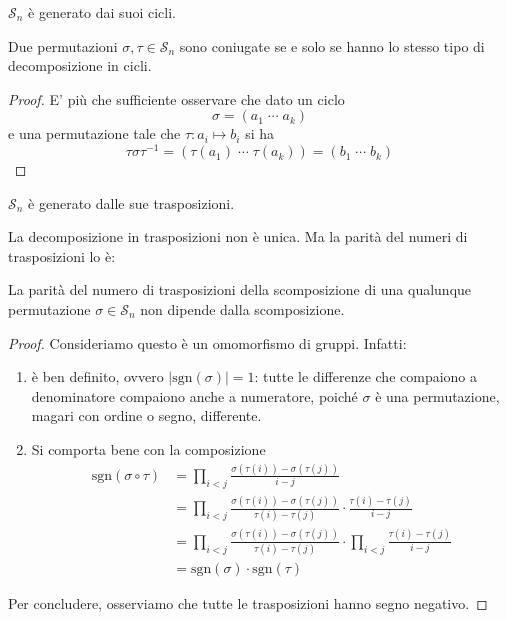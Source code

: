 \begin{multicols}{2}
\begin{remark}
	$ \mathcal{S}_n $ è generato dai suoi cicli.
\end{remark}
\begin{prop}
	Due permutazioni $ \sigma, \tau \in \mathcal{S}_n $ sono coniugate se e solo se hanno lo stesso tipo di decomposizione in cicli.
\end{prop}
\begin{proof}
	E' più che sufficiente osservare che dato un ciclo $$  \sigma = (a_1 \; \cdots \; a_k)  $$ e una permutazione tale che $ \tau : a_i \mapsto b_i $ si ha
	\[\tau\sigma\tau^{-1} = (\tau(a_1) \; \cdots \; \tau(a_k)) = (b_1 \; \cdots \; b_k) \]
\end{proof}
\begin{remark}
	$ \mathcal{S}_n $ è generato dalle sue trasposizioni.
\end{remark}
\begin{remark}
	La decomposizione in trasposizioni non è unica. Ma la parità del numeri di trasposizioni lo è:
\end{remark}
\begin{theorem}
	La parità del numero di trasposizioni della scomposizione di una qualunque permutazione $ \sigma \in \mathcal{S}_n $ non dipende dalla scomposizione.
\end{theorem}
\begin{proof}
	Consideriamo
	questo è un omomorfismo di gruppi. Infatti:
	\begin{enumerate}
		\item è ben definito, ovvero $ |\text{sgn}(\sigma)| = 1 $: tutte le differenze che compaiono a denominatore compaiono anche a numeratore, poiché $ \sigma $ è una permutazione, magari con ordine o segno, differente.
		\item Si comporta bene con la composizione
		\begin{align*}
			\text{sgn}(\sigma \circ \tau) &= \prod_{i < j}\frac{\sigma(\tau(i))-\sigma(\tau(j))}{i-j} \\
			& = \prod_{i < j}\frac{\sigma(\tau(i))-\sigma(\tau(j))}{\tau(i)-\tau(j)}\cdot \frac{\tau(i)-\tau(j)}{i-j} \\
			& = \prod_{i < j}\frac{\sigma(\tau(i))-\sigma(\tau(j))}{\tau(i)-\tau(j)}\cdot\prod_{i < j} \frac{\tau(i)-\tau(j)}{i-j}\\
			& = \text{sgn}(\sigma)\cdot \text{sgn}(\tau)
		\end{align*}
	\end{enumerate}
	Per concludere, osserviamo che tutte le trasposizioni hanno segno negativo. 
\end{proof}


\end{multicols}
